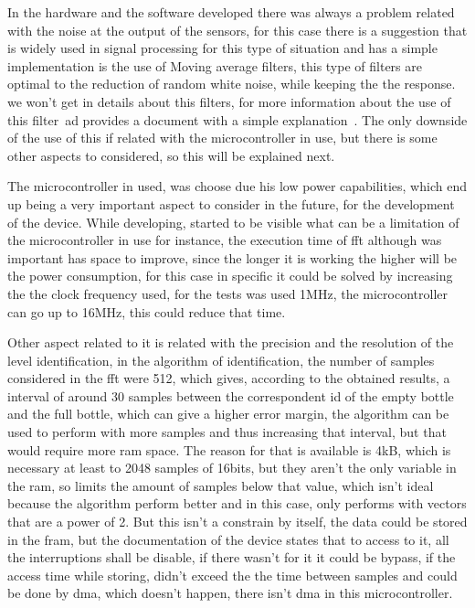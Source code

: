 In the hardware and the software developed there was always a problem related with the noise at the output of the sensors, for this case there is a suggestion that is widely used in signal processing for this type of situation and has a simple implementation is the use of Moving average filters, this type of filters are optimal to the reduction of random white noise, while keeping the the response. we won't get in details about this filters, for more information about the use of this filter~\acrlong{ad} provides a document with a simple explanation~\cite{smith1997scientist}. The only downside of the use of this if related with the microcontroller in use, but there is some other aspects to considered, so this will be explained next.

The microcontroller in used, was choose due his low power capabilities, which end up being a very important aspect to consider in the future, for the development of the device. While developing, started to be visible what can be a limitation of the microcontroller in use for instance, the execution time of \acrshort{fft} although was important has space to improve, since the longer it is working the higher will be the power consumption, for this case in specific it could be solved by increasing the the clock frequency used, for the tests was used 1MHz, the microcontroller can go up to 16MHz, this could reduce that time. 

Other aspect related to it is related with the precision and the resolution of the level identification, in the algorithm of identification, the number of samples considered in the \acrshort{fft} were 512, which gives, according to the obtained results, a interval of around 30 samples between the correspondent id of the empty bottle and the full bottle, which can give a higher error margin, the algorithm can be used to perform with more samples and thus increasing that interval, but that would require more \acrshort{ram} space. The reason for that is available is 4kB, which is necessary at least to 2048 samples of 16bits, but they aren't the only variable in the \acrshort{ram}, so limits the amount of samples below that value, which isn't ideal because the algorithm perform better and in this case, only performs with vectors that are a power of 2. But this isn't a constrain by itself, the data could be stored in the \acrshort{fram}, but the documentation of the device states that to access to it, all the interruptions shall be disable, if there wasn't for it it could be bypass, if the access time while storing, didn't exceed the the time between samples and could be done by \acrshort{dma}, which doesn't happen, there isn't \acrshort{dma} in this microcontroller.

